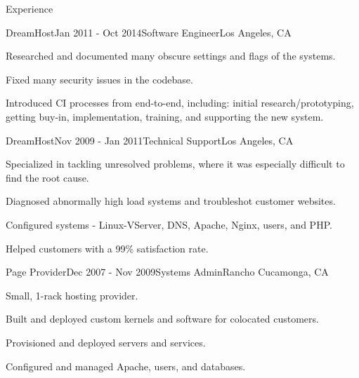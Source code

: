 \documentclass{resume} %
\begin{document}
\begin{rSection}{Experience}
\begin{rSubsection}{DreamHost}{Jan 2011 - Oct 2014}{Software Engineer}{Los Angeles, CA}
\item Researched and documented many obscure settings and flags of the systems.
\item Fixed many security issues in the codebase.
\item Introduced CI processes from end-to-end, including: initial research/prototyping, getting buy-in, implementation, training, and supporting the new system.
\end{rSubsection}


\begin{rSubsection}{DreamHost}{Nov 2009 - Jan 2011}{Technical Support}{Los Angeles, CA}
\item Specialized in tackling unresolved problems, where it was especially difficult to find the root cause.
\item Diagnosed abnormally high load systems and troubleshot customer websites.
\item Configured systems - Linux-VServer, DNS, Apache, Nginx, users, and PHP.
\item Helped customers with a 99\% satisfaction rate.
\end{rSubsection}


\begin{rSubsection}{Page Provider}{Dec 2007 - Nov 2009}{Systems Admin}{Rancho Cucamonga, CA}
\item Small, 1-rack hosting provider.
\item Built and deployed custom kernels and software for colocated customers.
\item Provisioned and deployed servers and services.
\item Configured and managed Apache, users, and databases.
\end{rSubsection}

\end{rSection}

\end{document}
